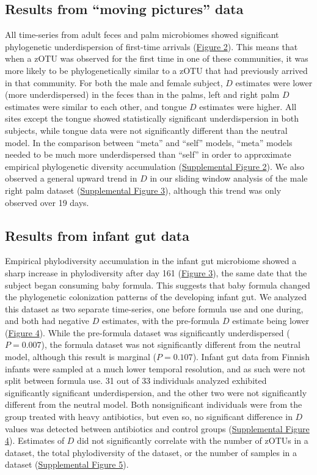 \documentclass{article}
\begin{document}
\subsection{Results from “moving pictures” data}
All time-series from adult feces and palm microbiomes \cite{Caporaso2011} showed significant phylogenetic underdispersion of first-time arrivals (\hyperref[sec:figure2]{Figure 2}). This means that when a zOTU was observed for the first time in one of these communities, it was more likely to be phylogenetically similar to a zOTU that had previously arrived in that community. For both the male and female subject, \(D\) estimates were lower (more underdispersed) in the feces than in the palms, left and right palm \(D\) estimates were similar to each other, and tongue \(D\) estimates were higher. All sites except the tongue showed statistically significant underdispersion in both subjects, while tongue data were not significantly different than the neutral model. In the comparison between “meta” and “self” models, “meta” models needed to be much more underdispersed than “self” in order to approximate empirical phylogenetic diversity accumulation (\hyperref[sec:figureS2]{Supplemental Figure 2}). We also observed a general upward trend in \(D\) in our sliding window analysis of the male right palm dataset (\hyperref[sec:figureS3]{Supplemental Figure 3}), although this trend was only observed over 19 days.

\subsection{Results from infant gut data}
Empirical phylodiversity accumulation in the infant gut microbiome \cite{Koenig2011} showed a sharp increase in phylodiversity after day 161 (\hyperref[sec:figure3]{Figure 3}), the same date that the subject began consuming baby formula. This suggests that baby formula changed the phylogenetic colonization patterns of the developing infant gut. We analyzed this dataset as two separate time-series, one before formula use and one during, and both had negative \(D\) estimates, with the pre-formula \(D\) estimate being lower (\hyperref[sec:figure4]{Figure 4}). While the pre-formula dataset was significantly underdispersed (\(P = 0.007\)), the formula dataset was not significantly different from the neutral model, although this result is marginal (\(P = 0.107\)). Infant gut data from Finnish infants \cite{Yassour2016} were sampled at a much lower temporal resolution, and as such were not split between formula use. 31 out of 33 individuals analyzed exhibited significantly significant underdispersion, and the other two were not significantly different from the neutral model. Both nonsignificant individuals were from the group treated with heavy antibiotics, but even so, no significant difference in \(D\) values was detected between antibiotics and control groups (\hyperref[sec:figureS4]{Supplemental Figure 4}). Estimates of \(D\) did not significantly correlate with the number of zOTUs in a dataset, the total phylodiversity of the dataset, or the number of samples in a dataset (\hyperref[sec:figureS5]{Supplemental Figure 5}). 
\end{document}
